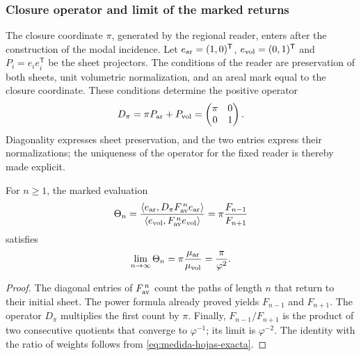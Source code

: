 \subsubsection{Closure operator and limit of the marked returns}
\label{sec:operador-retorno-marcado}

The closure coordinate \(\pi\), generated by the regional reader,
enters after the construction of the modal incidence. Let
\(e_{\rm ar}=(1,0)^{\mathsf T}\),
\(e_{\rm vol}=(0,1)^{\mathsf T}\) and
\(P_i=e_ie_i^{\mathsf T}\) be the sheet projectors. The conditions
of the reader are preservation of both sheets, unit volumetric
normalization, and an areal mark equal to the closure coordinate. These
conditions determine the positive operator
\begin{equation}
 D_\pi=\pi P_{\rm ar}+P_{\rm vol}
       =\begin{pmatrix}\pi&0\\0&1\end{pmatrix}.
 \label{eq:operador-marca-pi}
\end{equation}
Diagonality expresses sheet preservation, and the two entries express
their normalizations; the uniqueness of the operator for the fixed reader
is thereby made explicit.

\begin{proposition}
For \(n\geq1\), the marked evaluation
\begin{equation}
 \Theta_n=
 \frac{\langle e_{\rm ar},D_\pi F_{\rm av}^{\,n}e_{\rm ar}\rangle}
 {\langle e_{\rm vol},F_{\rm av}^{\,n}e_{\rm vol}\rangle}
 =\pi\frac{F_{n-1}}{F_{n+1}}
 \label{eq:retorno-marcado-finito}
\end{equation}
satisfies
\begin{equation}
 \lim_{n\to\infty}\Theta_n
 =\pi\frac{\mu_{\rm ar}}{\mu_{\rm vol}}
 =\frac{\pi}{\varphi^2}.
 \label{eq:retorno-marcado-limite}
\end{equation}
\end{proposition}
\begin{proof}
The diagonal entries of \(F_{\rm av}^{\,n}\) count the paths
of length \(n\) that return to their initial sheet. The power formula
already proved yields \(F_{n-1}\) and \(F_{n+1}\). The operator
\(D_\pi\) multiplies the first count by \(\pi\). Finally,
\(F_{n-1}/F_{n+1}\) is the product of two consecutive quotients
that converge to \(\varphi^{-1}\); its limit is
\(\varphi^{-2}\). The identity with the ratio of weights follows from
\eqref{eq:medida-hojas-exacta}.
\end{proof}

